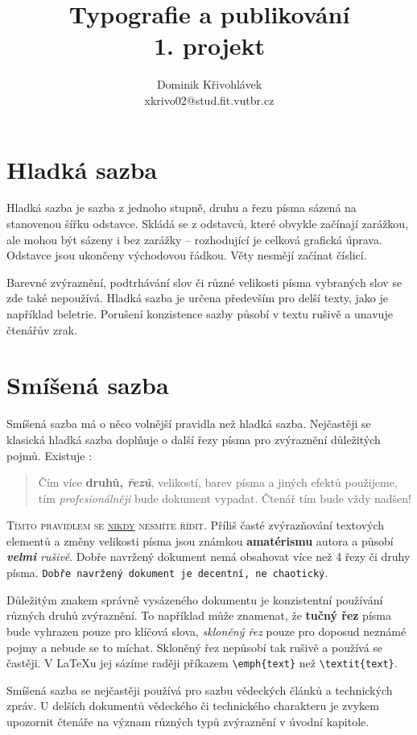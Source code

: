 \documentclass[11pt,twocolumn, a4paper]{article}
\title{Typografie a publikování\\
1. projekt\\}
\author{Dominik Křivohlávek\\
xkrivo02@stud.fit.vutbr.cz}
\date{} %
\begin{document}
\maketitle
%
\section{Hladká sazba}
Hladká sazba je sazba z jednoho stupně, druhu a řezu písma sázená na stanovenou šířku odstavce. Skládá se z odstavců, které obvykle začínají zarážkou, ale mohou být sázeny i bez zarážky -- rozhodující je celková grafická úprava. Odstavce jsou ukončeny východovou řádkou. Věty nesmějí začínat číslicí.\par
%
Barevné zvýraznění, podtrhávání slov či různé velikosti písma vybraných slov se zde také nepoužívá. Hladká sazba je určena především pro delší texty, jako je například beletrie. Porušení konzistence sazby působí v textu rušivě a unavuje čtenářův zrak.\par
%
\section{Smíšená sazba}
Smíšená sazba má o něco volnější pravidla než hladká sazba. Nejčastěji se klasická hladká sazba doplňuje o další řezy písma pro zvýraznění důležitých pojmů. Existuje :
%
\begin{quotation}
Čím více \textbf{druhů, \emph{řezů}}, {\scriptsize velikostí}, barev pí\-sma a jiných efektů použijeme, tím \emph{profesionálněji} bude dokument vypadat. Čtenář tím bude vždy \textmd{\Huge nadšen!}
\end{quotation}
%
\textsc{\quad Tímto pravidlem se \underline{nikdy} nesmíte řídit.}
Příliš časté zvýrazňování textových elementů a změny velikosti {\tiny písma} jsou {\LARGE známkou} \textbf{\huge amatéris\-mu} autora a působí \emph{\textbf{velmi}} \emph{rušivě}. Dobře navržený dokument nemá obsahovat více než 4 řezy či druhy písma. \texttt{Dobře navr\-žený dokument je decentní, ne chaotický}.\par
%
Důležitým znakem správně vysázeného dokumentu je konzistentní používání různých druhů zvýraznění. To například může znamenat, že \textbf{tučný řez} písma bude vyhrazen pouze pro klíčová slova, \emph{skloněný řez} pouze pro doposud neznámé pojmy a nebude se to míchat. Skloněný řez nepůsobí tak rušivě a používá se častěji. V \LaTeX u jej sázíme raději příkazem {\ttfamily \verb|\emph{text}|} než {\ttfamily\verb|\textit{text}|}.\par
%
Smíšená sazba se nejčastěji používá pro sazbu vě\-deckých článků a technických zpráv. U delších dokumentů vědeckého či technického charakteru je zvykem upozornit čtenáře na význam různých typů zvýrazně\-ní v úvodní kapitole.\par
%
\end{document}
